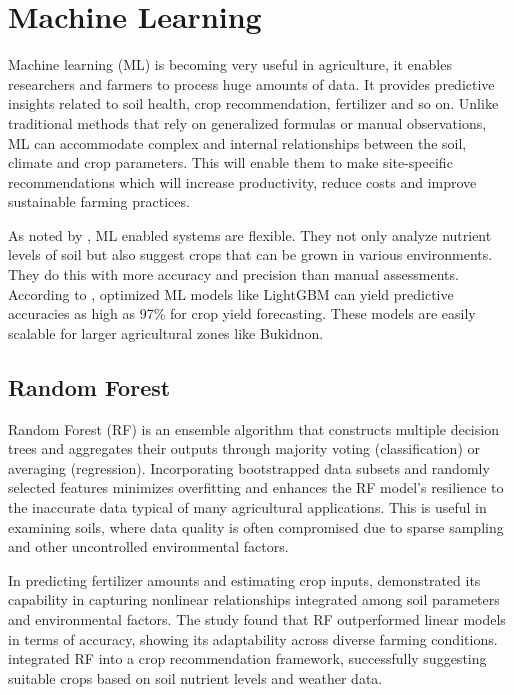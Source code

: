 {	\section{Machine Learning}
	Machine learning (ML) is becoming very useful in agriculture, it enables researchers and farmers to process huge amounts of data. It provides predictive insights related to soil health, crop recommendation, fertilizer and so on. Unlike traditional methods that rely on generalized formulas or manual observations, ML can accommodate complex and internal relationships between the soil, climate and crop parameters. This will enable them to make site-specific recommendations which will increase productivity, reduce costs and improve sustainable farming practices.
	
	As noted by \cite{Islam2023}, ML enabled systems are flexible. They not only analyze nutrient levels of soil but also suggest crops that can be grown in various environments. They do this with more accuracy and precision than manual assessments. According to \cite{Parganiha2024}, optimized ML models like LightGBM can yield predictive accuracies as high as 97\% for crop yield forecasting. These models are easily scalable for larger agricultural zones like Bukidnon.
	
	\subsection{Random Forest}
	Random Forest (RF) is an ensemble algorithm that constructs multiple decision trees and aggregates their outputs through majority voting (classification) or averaging (regression). Incorporating bootstrapped data subsets and randomly selected features minimizes overfitting and enhances the RF model’s resilience to the inaccurate data typical of many agricultural applications. This is useful in examining soils, where data quality is often compromised due to sparse sampling and other uncontrolled environmental factors.
	
	In predicting fertilizer amounts and estimating crop inputs, \cite{Sani2023CropRS} demonstrated its capability in capturing nonlinear relationships integrated among soil parameters and environmental factors. The study found that RF outperformed linear models in terms of accuracy, showing its adaptability across diverse farming conditions. \cite{Islam2023} integrated RF into a crop recommendation framework, successfully suggesting suitable crops based on soil nutrient levels and weather data.
	
}
